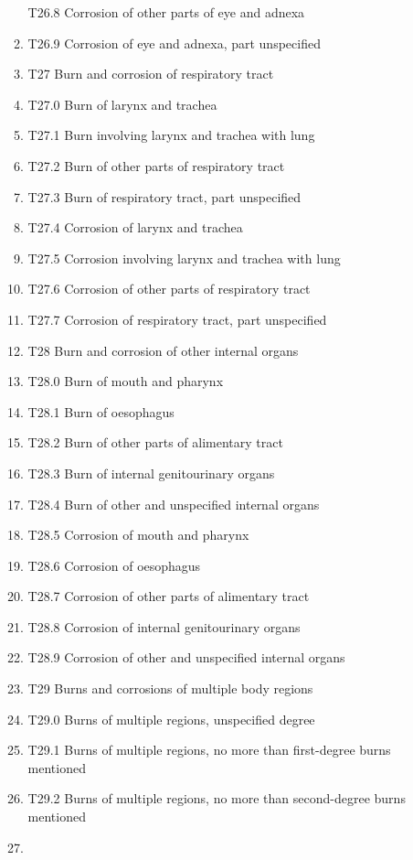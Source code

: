 \documentclass[
]{scrartcl}
\begin{document}
\begin{itemize}
\begin{enumerate}
    T26.8 Corrosion of other parts of eye and adnexa
  \item
    T26.9 Corrosion of eye and adnexa, part unspecified
  \item
    T27 Burn and corrosion of respiratory tract
  \item
    T27.0 Burn of larynx and trachea
  \item
    T27.1 Burn involving larynx and trachea with lung
  \item
    T27.2 Burn of other parts of respiratory tract
  \item
    T27.3 Burn of respiratory tract, part unspecified
  \item
    T27.4 Corrosion of larynx and trachea
  \item
    T27.5 Corrosion involving larynx and trachea with lung
  \item
    T27.6 Corrosion of other parts of respiratory tract
  \item
    T27.7 Corrosion of respiratory tract, part unspecified
  \item
    T28 Burn and corrosion of other internal organs
  \item
    T28.0 Burn of mouth and pharynx
  \item
    T28.1 Burn of oesophagus
  \item
    T28.2 Burn of other parts of alimentary tract
  \item
    T28.3 Burn of internal genitourinary organs
  \item
    T28.4 Burn of other and unspecified internal organs
  \item
    T28.5 Corrosion of mouth and pharynx
  \item
    T28.6 Corrosion of oesophagus
  \item
    T28.7 Corrosion of other parts of alimentary tract
  \item
    T28.8 Corrosion of internal genitourinary organs
  \item
    T28.9 Corrosion of other and unspecified internal organs
  \item
    T29 Burns and corrosions of multiple body regions
  \item
    T29.0 Burns of multiple regions, unspecified degree
  \item
    T29.1 Burns of multiple regions, no more than first-degree burns
    mentioned
  \item
    T29.2 Burns of multiple regions, no more than second-degree burns
    mentioned
  \item

\end{enumerate}
\end{itemize}
\end{document}
